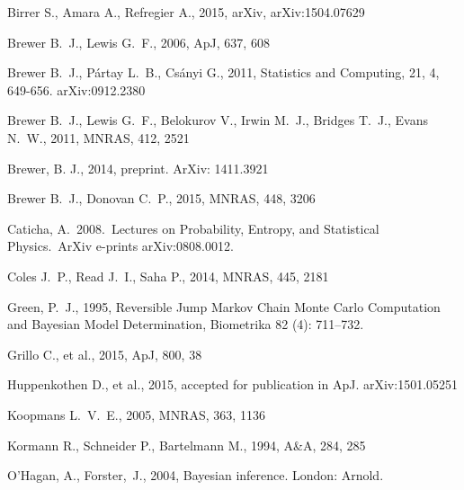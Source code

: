 \documentclass[useAMS,usenatbib]{mn2e}
\begin{document}
\begin{thebibliography}{99}
 Birrer S., Amara A., Refregier A., 2015, arXiv, arXiv:1504.07629

 Brewer B.~J., Lewis G.~F., 2006, ApJ, 637, 608

 Brewer B.~J., P{\'a}rtay L.~B., Cs{\'a}nyi G., 2011,
Statistics and Computing, 21, 4, 649-656. arXiv:0912.2380

Brewer B.~J., Lewis G.~F., Belokurov V., Irwin M.~J., Bridges T.~J., Evans 
N.~W., 2011, MNRAS, 412, 2521

 Brewer, B. J., 2014,
preprint. ArXiv: 1411.3921

 Brewer B.~J., Donovan C.~P., 2015, MNRAS, 448, 3206 

 Caticha, A.\ 2008.\ Lectures 
on Probability, Entropy, and Statistical Physics.\ ArXiv e-prints 
arXiv:0808.0012. 

 Coles J.~P., Read J.~I., Saha P., 2014, MNRAS, 445, 2181

Green, P.~J., 1995, Reversible Jump Markov Chain Monte Carlo Computation and Bayesian Model Determination, Biometrika 82 (4): 711–732.

Grillo C., et al., 2015, ApJ, 800, 38 

 Huppenkothen D., et al., 2015,
accepted for publication in ApJ. arXiv:1501.05251 

Koopmans L.~V.~E., 2005, MNRAS, 363, 1136

 Kormann R., Schneider P., Bartelmann M., 1994, A\&A, 284, 285

O'Hagan, A., Forster,~J., 2004, Bayesian inference. London: Arnold.


\end{thebibliography}
\end{document}
